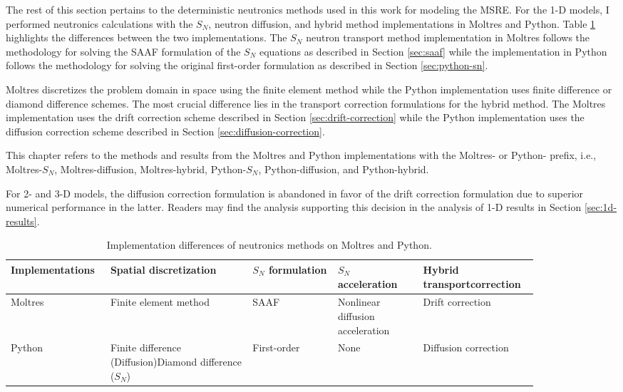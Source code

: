 The rest of this section pertains to the deterministic neutronics methods used in this work for
modeling the \gls{MSRE}.
For the 1-D models, I performed neutronics calculations with the $S_N$, neutron diffusion, and
hybrid method implementations in Moltres and Python. Table \ref{table:nts-methods} highlights the
differences between the two implementations. The $S_N$ neutron transport method implementation in
Moltres follows the methodology for solving the \gls{SAAF} formulation of the $S_N$ equations as
described in Section \ref{sec:saaf} while the implementation in Python follows the methodology
for solving the original first-order formulation as described in Section \ref{sec:python-sn}.

Moltres discretizes the problem domain in space using the finite element
method while the Python implementation uses finite difference or diamond difference schemes. The
most crucial difference lies in the transport correction formulations for the hybrid method. The
Moltres implementation uses the drift correction scheme described in Section
\ref{sec:drift-correction} while the Python implementation uses the diffusion correction
scheme described in Section \ref{sec:diffusion-correction}.

This chapter refers to the methods and results from the Moltres and Python implementations
with the Moltres- or Python- prefix, i.e., Moltres-$S_N$, Moltres-diffusion, Moltres-hybrid,
Python-$S_N$, Python-diffusion, and Python-hybrid.

For 2- and 3-D models, the diffusion correction formulation is abandoned in favor of the drift
correction formulation due to superior numerical performance in the latter. Readers may find the
analysis supporting this decision in the analysis of 1-D results in Section \ref{sec:1d-results}.

\begin{table}[htb!]
  \centering
  \footnotesize
  \caption{Implementation differences of neutronics methods on Moltres and Python.}
  \begin{tabular}{p{0.14\linewidth} p{0.25\linewidth} p{0.15\linewidth} p{0.15\linewidth} p{0.17\linewidth}}
    \toprule
    Implementations & Spatial discretization & $S_N$ formulation & $S_N$ acceleration &
    Hybrid transport\newline correction \\
    \midrule
    Moltres & Finite element method & SAAF & Nonlinear diffusion acceleration & Drift correction \\
    Python & Finite difference (Diffusion)\newline Diamond difference ($S_N$) & First-order & None & Diffusion correction \\
    \bottomrule
  \end{tabular}
  \label{table:nts-methods}
\end{table}

